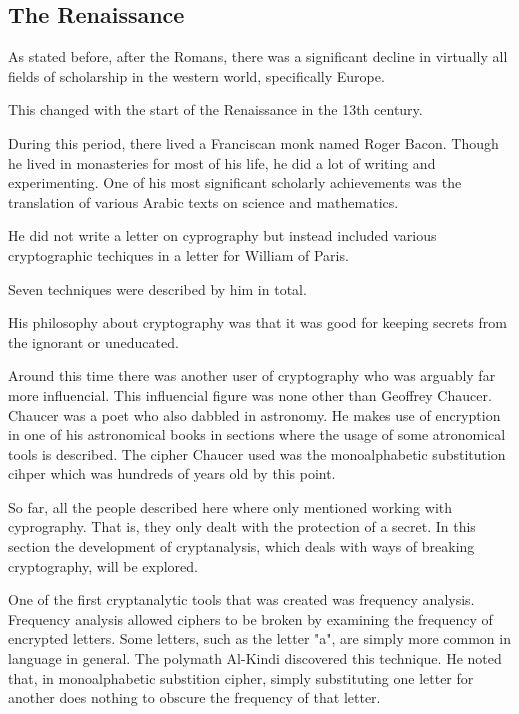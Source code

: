 \documentclass{article}
\begin{document}
    \subsection{The Renaissance}

    As stated before, after the Romans, there was a significant decline in
    virtually all fields of scholarship in the western world, specifically Europe.

    This changed with the start of the Renaissance in the 13th century.

    During this period, there lived a Franciscan monk named Roger Bacon.
    Though he lived in monasteries for most of his life, he did a lot of writing
    and experimenting.
    One of his most significant scholarly achievements was the translation
    of various Arabic texts on science and mathematics.
    
    He did not write a letter on cyprography but instead included various
    cryptographic techiques in a letter for William of Paris.

    Seven techniques were described by him in total.
   
    His philosophy about cryptography was that it was good for keeping secrets
    from the ignorant or uneducated.

    Around this time there was another user of cryptography who was arguably
    far more influencial. This influencial figure was none other than Geoffrey Chaucer.
    Chaucer was a poet who also dabbled in astronomy. He makes use of encryption
    in one of his astronomical books in sections where the usage of some atronomical tools
    is described.
    The cipher Chaucer used was the monoalphabetic substitution cihper which was hundreds
    of years old by this point.

    So far, all the people described here where only mentioned working with cyprography.
    That is, they only dealt with the protection of a secret. In this section the development
    of cryptanalysis, which deals with ways of breaking cryptography, will be explored.

    One of the first cryptanalytic tools that was created was frequency analysis.
    Frequency analysis allowed ciphers to be broken by examining the frequency of
    encrypted letters. Some letters, such as the letter "a", are simply more common
    in language in general.
    The polymath Al-Kindi discovered this technique. He noted that, in monoalphabetic
    substition cipher, simply substituting one letter for another does nothing
    to obscure the frequency of that letter.
\end{document}
